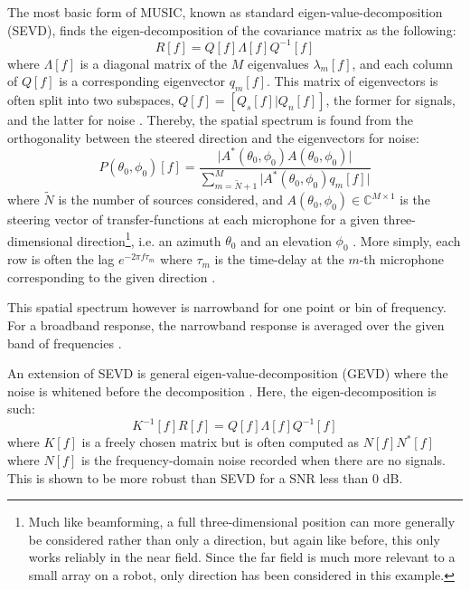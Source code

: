 \documentclass[notitlepage]{report}
\begin{document}
The most basic form of MUSIC, known as standard eigen-value-decomposition (SEVD), finds the eigen-decomposition of the covariance matrix as the following:
\begin{equation}
R[f] = Q[f]\Lambda[f]Q^{-1}[f]
\end{equation}
where $\Lambda[f]$ is a diagonal matrix of the $M$ eigenvalues $\lambda_m[f]$, and each column of $Q[f]$ is a corresponding eigenvector $q_m[f]$. This matrix of eigenvectors is often split into two subspaces, $Q[f] = [Q_s[f]|Q_n[f]]$, the former for signals, and the latter for noise \cite{rascon_localization_2017}. Thereby, the spatial spectrum is found from the orthogonality between the steered direction and the eigenvectors for noise:
\begin{equation}
P(\theta_0, \phi_0)[f] = \frac{\lvert A^*(\theta_0, \phi_0) A(\theta_0, \phi_0) \rvert}
	{\sum_{m=\tilde{N}+1}^M \lvert A^*(\theta_0, \phi_0) q_m[f] \rvert}
\end{equation}
where $\tilde{N}$ is the number of sources considered, and $A(\theta_0, \phi_0)\in \mathbb{C}^{M\times 1}$ is the steering vector of transfer-functions at each microphone for a given three-dimensional direction\footnote{Much like beamforming, a full three-dimensional position can more generally be considered rather than only a direction, but again like before, this only works reliably in the near field. Since the far field is much more relevant to a small array on a robot, only direction has been considered in this example.}, i.e. an azimuth $\theta_0$ and an elevation $\phi_0$ \cite{nakamura_real-time_2012}. More simply, each row is often the lag $e^{-2\pi f\tau_m}$ where $\tau_m$ is the time-delay at the $m$-th microphone corresponding to the given direction \cite{rascon_localization_2017}.

This spatial spectrum however is narrowband for one point or bin of frequency. For a broadband response, the narrowband response is averaged over the given band of frequencies \cite{ishi_effects_2011} \cite{nakamura_real-time_2012}.

An extension of SEVD is general eigen-value-decomposition (GEVD) where the noise is whitened before the decomposition \cite{nakamura_intelligent_2009} \cite{nakamura_intelligent_2011} \cite{nakamura_real-time_2012}. Here, the eigen-decomposition is such:
\begin{equation}
K^{-1}[f] R[f] = Q[f] \Lambda[f] Q^{-1}[f]
\end{equation}
where $K[f]$ is a freely chosen matrix but is often computed as $N[f]N^*[f]$ where $N[f]$ is the frequency-domain noise recorded when there are no signals. This is shown to be more robust than SEVD for a SNR less than 0 \si{dB}.
\end{document}
